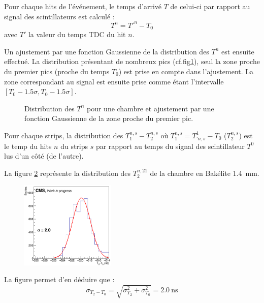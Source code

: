 Pour chaque hits de l'événement, le temps d'arrivé $T$ de celui-ci par rapport au signal des scintillateurs est calculé :
\begin{equation}
	T^n=T'^n-T_0
\end{equation}
avec $T'$ la valeur du temps TDC du hit $n$. 

Un ajustement par une fonction Gaussienne de la distribution des $T^n$ est ensuite effectué. La distribution présentant de nombreux pics (cf.fig\ref{pics}), seul la zone proche du premier pics (proche du temps $T_0$) est prise en compte dans l'ajustement. La zone correspondant au signal est ensuite prise comme étant l'intervalle $\left[T_0-\num{1.5}\sigma,T_0-\num{1.5}\sigma\right]$.

\begin{figure}[!ht]
	\centering
	\caption{Distribution des $T^n$ pour une chambre et ajustement par une fonction Gaussienne de la zone proche du premier pic.}
	\label{pics}
\end{figure}

Pour chaque strips, la distribution des $T^{n,s}_1-T^{n,s}_2$ où $T^{n,s}_1=T_{'n,s}^{1}-T_0$ ($T^{n,s}_2$) est le temp du hits $n$ du strips $s$ par rapport au temps du signal des scintillateur $T^{0}$ lus d'un côté (de l'autre).

La figure \ref{t2t0} représente la distribution des $T^{n,21}_2$ de la chambre en Bakélite \SI{1.4}{\milli\meter}.
\begin{figure}[ht!]
	\centering
	\includegraphics[width=0.40\textwidth]{ELE/TimingFitsRunT1T0_zoom_736185.jpg}
	\label{t2t0}
\end{figure}

La figure permet d'en déduire que :
\begin{equation}
\sigma_{T_2-T_0}=\sqrt{\sigma_{T_2}^2+\sigma_{T_0}^2}=\SI{2.0}{\nano\second}
\end{equation}

